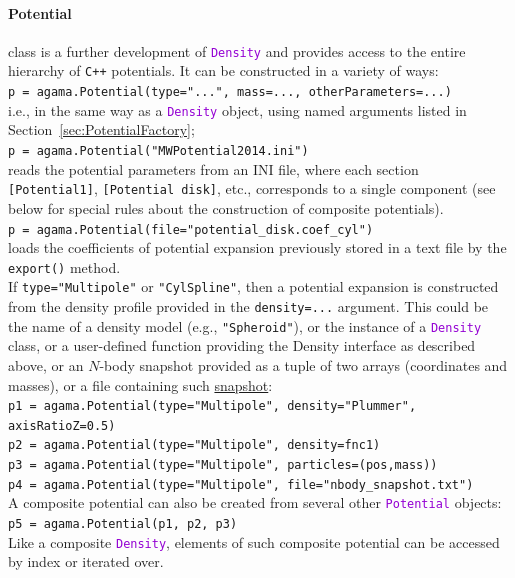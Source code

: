 \documentclass[12pt]{article}
\newcommand{\Cpp}  {\texttt{C++}\xspace}
\newcommand{\ttt}[1]{\textcolor{darkviolet}{\texttt{#1}}}
\newcommand{\ppp}[1]{\textcolor{darkolive} {\texttt{#1}}}
\begin{document}
\paragraph{Potential} class is a further development of \ttt{Density} and provides access to the entire hierarchy of \Cpp potentials. It can be constructed in a variety of ways: \\
\texttt{p = agama.Potential(type="...", mass=..., otherParameters=...)}\\
i.e., in the same way as a \ttt{Density} object, using named arguments listed in Section~\ref{sec:PotentialFactory};\\
\texttt{p = agama.Potential("MWPotential2014.ini")}\\
reads the potential parameters from an INI file, where each section \ppp{[Potential1]}, \ppp{[Potential disk]}, etc., corresponds to a single component (see below for special rules about the construction of composite potentials).\\
\texttt{p = agama.Potential(file="potential_disk.coef_cyl")}\\
loads the coefficients of potential expansion previously stored in a text file by the \texttt{export()} method.\\
If \ppp{type="Multipole"} or \ppp{"CylSpline"}, then a potential expansion is constructed from the density profile provided in the \ppp{density=...} argument. This could be the name of a density model (e.g., \ppp{"Spheroid"}), or the instance of a \ttt{Density} class, or a user-defined function providing the Density interface as described above, or an $N$-body snapshot provided as a tuple of two arrays (coordinates and masses), or a file containing such \hyperref[sec:PythonSnapshot]{snapshot}:\\
\texttt{p1 = agama.Potential(type="Multipole", density="Plummer", axisRatioZ=0.5)}\\
\texttt{p2 = agama.Potential(type="Multipole", density=fnc1)}\\
\texttt{p3 = agama.Potential(type="Multipole", particles=(pos,mass))}\\
\texttt{p4 = agama.Potential(type="Multipole", file="nbody_snapshot.txt")}\\[2mm]
A composite potential can also be created from several other \ttt{Potential} objects:\\
\texttt{p5 = agama.Potential(p1, p2, p3)}\\[2mm]
Like a composite \ttt{Density}, elements of such composite potential can be accessed by index or iterated over.
\end{document}
